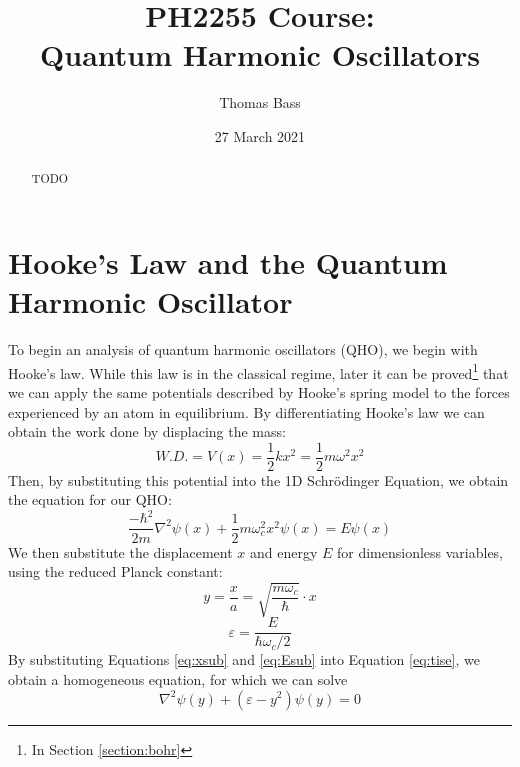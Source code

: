 \documentclass[a4paper]{article}
\title{PH2255 Course:\\
Quantum Harmonic Oscillators}
\author{Thomas Bass}
\date{27 March 2021}
\begin{document}
\maketitle

\begin{abstract}
TODO
\end{abstract}

\section{Hooke's Law and the Quantum Harmonic Oscillator}
To begin an analysis of quantum harmonic oscillators (QHO), we begin with Hooke's law. While this law is in the classical regime, later it can be proved\footnote{In Section \ref{section:bohr}} that we can apply the same potentials described by Hooke's spring model to the forces experienced by an atom in equilibrium. By differentiating Hooke's law we can obtain the work done by displacing the mass:
\begin{equation} \label{eq:hooke}
W.D.=V(x)=\frac12kx^2=\frac12m\omega^2x^2
\end{equation}
Then, by substituting this potential into the 1D Schr\"odinger Equation, we obtain the equation for our QHO:
\begin{equation} \label{eq:tise}
\frac{-\hbar^2}{2m}\nabla^2\psi(x) + \frac12m\omega^2_cx^2\psi(x)=E\psi(x)
\end{equation}
We then substitute the displacement $x$ and energy $E$ for dimensionless variables, using the reduced Planck constant:
\begin{equation} \label{eq:xsub}
y=\frac xa=\sqrt{\frac{m\omega_c}\hbar}\cdot x
\end{equation}
\begin{equation} \label{eq:Esub}
\varepsilon=\frac E{\hbar\omega_c/2}
\end{equation}
By substituting Equations \ref{eq:xsub} and \ref{eq:Esub} into Equation \ref{eq:tise}, we obtain a homogeneous equation, for which we can solve
\begin{equation} \label{eq:tise_hom}
\nabla^2\psi(y)+(\varepsilon-y^2)\psi(y)=0
\end{equation} 
\newpage
\end{document}
